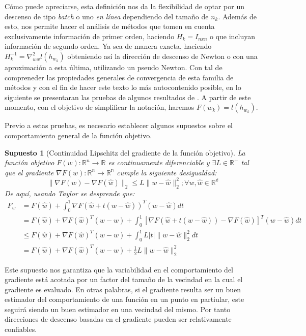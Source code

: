 \documentclass{book}
\theoremstyle{plain}
\newtheorem{assump}{Supuesto}[thm]
\theoremstyle{definition}
\theoremstyle{remark}
\begin{document}
Cómo puede apreciarse, esta definición nos da la flexibilidad de optar por un descenso de tipo \emph{batch} o uno  \emph{en línea} dependiendo del tamaño de $n_k$. Además de esto, nos permite hacer el análisis de métodos que tomen en cuenta exclusivamente información de primer orden, haciendo $H_k = I_{nxn}$ o que incluyan información de segundo orden. Ya sea de manera exacta, haciendo $H^{-1}_k = \nabla^2_{ww}l(h_{w_k})$ obteniendo así la dirección de descenso de Newton o con una aproximación a esta última, utilizando un pseudo Newton. Con tal de compreneder las propiedades generales de convergencia de esta familia de métodos y con el fin de hacer este texto lo más autocontenido posible, en lo siguiente se presentaran las pruebas de algunos resultados de \cite{BOTTOU}. A partir de este momento, con el objetivo de simplificar la notación, haremos $F(w_k) = l(h_{w_k})$.

Previo a estas pruebas, es necesario establecer algunos supuestos sobre el comportamiento general de la función objetivo.

\begin{assump}[Continuidad Lipschitz del gradiente de la función objetivo]\label{assump:lipschitz}
La función objetivo $F(w):\mathbb{R}^n\rightarrow\mathbb{R}$ es continuamente diferenciable y $\exists L\in\mathbb{R^+}$ tal que el gradiente $\nabla F(w):\mathbb{R}^n\rightarrow\mathbb{R^n}$ cumple la siguiente desigualdad:
\begin{equation}
    \|\nabla F(w)- \nabla F(\hat{w})\|_2 \leq L\|w-\hat{w}\|_2^2; \forall w, \hat{w} \in \mathbb{R^d}
\end{equation}
De aquí, usando Taylor se desprende que:
\begin{equation*}
    \begin{split}
    F_w & = F(\hat{w}) + \int_0^1\nabla F(\hat{w} + t(w- \hat{w}))^T(w-\hat{w})dt\\
    &= F(\hat{w}) + \nabla F(\hat{w})^T(w- \hat{w}) + \int_0^1[\nabla F(\hat{w} + t(w- \hat{w})) - \nabla F(\hat{w})]^T(w-\hat{w})dt\\
    &\leq F(\hat{w}) + \nabla F(\hat{w})^T(w- \hat{w}) + \int_0^1L|t|\|w - \hat{w}\|_2^2dt\\
    &= F(\hat{w}) + \nabla F(\hat{w})^T(w- \hat{w}) + \frac{1}{2}L\|w - \hat{w}\|_2^2
    \end{split}
\end{equation*}
\end{assump}

Este supuesto nos garantiza que la variabilidad en el comportamiento del gradiente está acotada por un factor del tamaño de la vecindad en la cual el gradiente es evaluado. En otras palabras, si el gradiente resulta ser un buen estimador del comportamiento de una función en un punto en partiular, este seguirá siendo un buen estimador en una vecindad del mismo. Por tanto direcciones de descenso basadas en el gradiente pueden ser relativamente confiables.
\end{document}
